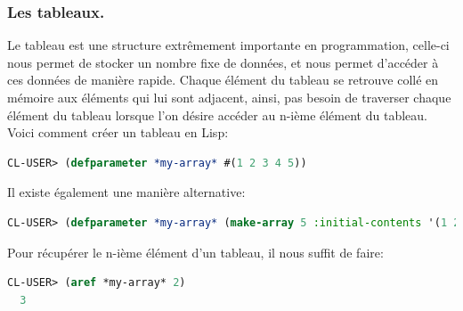 \documentclass[a4paper, 12pt]{article}
\numberwithin{equation}{subsection}
\begin{document}
\subsubsection{Les tableaux.}
Le tableau est une structure extrêmement importante en programmation,
celle-ci nous permet de stocker un nombre fixe de données, et nous permet d'accéder à ces données de manière rapide. Chaque élément du tableau se retrouve collé en mémoire aux éléments qui lui sont adjacent, ainsi, pas besoin de traverser chaque élément du tableau lorsque l'on désire accéder au n-ième élément du tableau. \\[0.2cm]
Voici comment créer un tableau en Lisp:
\begin{lstlisting}[language=Lisp]
  CL-USER> (defparameter *my-array* #(1 2 3 4 5))
\end{lstlisting}
Il existe également une manière alternative:
\begin{lstlisting}[language=Lisp]
  CL-USER> (defparameter *my-array* (make-array 5 :initial-contents '(1 2 3 4 5)))
\end{lstlisting}
Pour récupérer le n-ième élément d'un tableau, il nous suffit de faire:
\begin{lstlisting}[language=Lisp]
  CL-USER> (aref *my-array* 2)
  3
\end{lstlisting}
\end{document}
